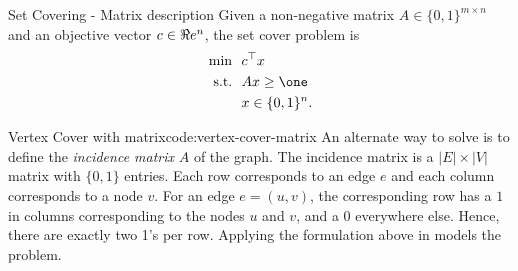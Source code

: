 

%

\begin{general}{Set Covering - Matrix description}{\npcomplete}
\label{general:set-covering-alternate}
Given a non-negative matrix $A \in \{0,1\}^{m \times n}$ and an objective vector $c \in \Re e^n$, the set cover problem is
\begin{equation}
\begin{split}
\min \ \ & c^\top x\\
\text{s.t.} \ \ & Ax \geq \one \\
& x \in \{0,1\}^n.
\end{split}
\end{equation}
\end{general}
\begin{examplewithoutcode}{Vertex Cover with matrix}{code:vertex-cover-matrix}
An alternate way to solve  is to define the \emph{incidence matrix} $A$ of the graph.  The incidence matrix is a $|E| \times |V|$ matrix with $\{0,1\}$ entries.  Each row corresponds to an edge $e$ and each column corresponds to a node $v$.  For an edge $e = (u,v)$, the corresponding row has a $1$ in columns corresponding to the nodes $u$ and $v$, and a 0 everywhere else.  Hence, there are exactly two 1's per row.  Applying the formulation above in  models the problem.
\end{examplewithoutcode}




%
